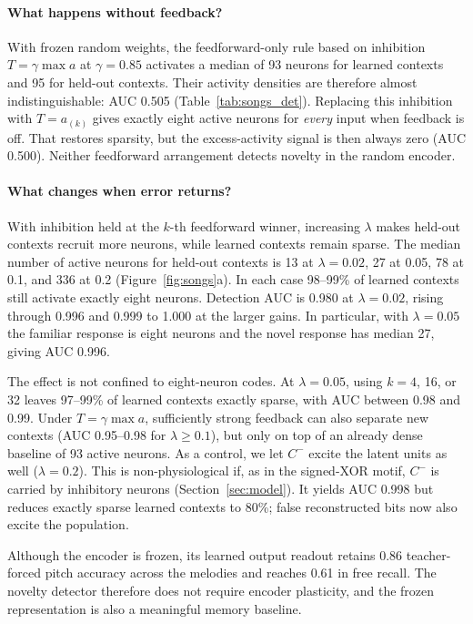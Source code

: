 \documentclass[11pt,a4paper]{article}
\begin{document}
\paragraph{What happens without feedback?}
With frozen random weights, the feedforward-only rule based on inhibition $T=\gamma\max a$ at $\gamma=0.85$ activates a median of 93 neurons for learned contexts and 95 for held-out contexts. Their activity densities are therefore almost indistinguishable: AUC 0.505 (Table~\ref{tab:songs_det}). Replacing this inhibition with $T=a_{(k)}$ gives exactly eight active neurons for \emph{every} input when feedback is off. That restores sparsity, but the excess-activity signal is then always zero (AUC 0.500). Neither feedforward arrangement detects novelty in the random encoder.

\paragraph{What changes when error returns?}
With inhibition held at the $k$-th feedforward winner, increasing $\lambda$ makes held-out contexts recruit more neurons, while learned contexts remain sparse. The median number of active neurons for held-out contexts is 13 at $\lambda=0.02$, 27 at 0.05, 78 at 0.1, and 336 at 0.2 (Figure~\ref{fig:songs}a). In each case 98--99\% of learned contexts still activate exactly eight neurons. Detection AUC is 0.980 at $\lambda=0.02$, rising through 0.996 and 0.999 to 1.000 at the larger gains. In particular, with $\lambda=0.05$ the familiar response is eight neurons and the novel response has median 27, giving AUC 0.996.

The effect is not confined to eight-neuron codes. At $\lambda=0.05$, using $k=4$, 16, or 32 leaves 97--99\% of learned contexts exactly sparse, with AUC between 0.98 and 0.99. Under $T=\gamma\max a$, sufficiently strong feedback can also separate new contexts (AUC 0.95--0.98 for $\lambda\ge0.1$), but only on top of an already dense baseline of 93 active neurons. As a control, we let $C^-$ excite the latent units as well ($\lambda=0.2$). This is non-physiological if, as in the signed-XOR motif, $C^-$ is carried by inhibitory neurons (Section~\ref{sec:model}). It yields AUC 0.998 but reduces exactly sparse learned contexts to 80\%; false reconstructed bits now also excite the population.

Although the encoder is frozen, its learned output readout retains 0.86 teacher-forced pitch accuracy across the melodies and reaches 0.61 in free recall. The novelty detector therefore does not require encoder plasticity, and the frozen representation is also a meaningful memory baseline.
\end{document}
